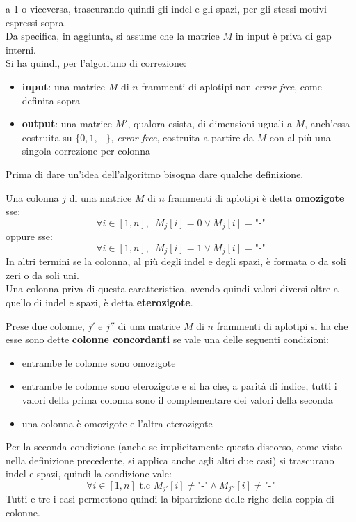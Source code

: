 \documentclass[a4paper,12pt, oneside]{book}
\begin{document}
a 1 o viceversa, trascurando quindi gli indel e gli spazi, per gli stessi motivi
espressi sopra.\\
Da specifica, in aggiunta, si assume che la matrice $M$ in input è priva di gap
interni.\\ 
Si ha quindi, per l'algoritmo di correzione:
\begin{itemize}
  \item \textbf{input}: una matrice $M$ di $n$ frammenti di aplotipi non
  \textit{error-free}, come definita sopra
  \item \textbf{output}: una matrice $M'$, qualora esista, di dimensioni uguali
  a $M$, anch'essa costruita su $\{0,1,-\}$, \textit{error-free}, costruita a
  partire da $M$ con al più una singola correzione per colonna
\end{itemize}
Prima di dare un'idea dell'algoritmo bisogna dare qualche definizione.
\begin{definizione}
  Una colonna $j$ di una matrice $M$ di $n$ frammenti di aplotipi è detta
  \textbf{omozigote} sse:
  \[\forall i\in[1,n],\,\,\, M_j[i]=0\lor M_j[i]=\mbox{"-"}\]
  oppure sse:
  \[\forall i\in[1,n],\,\,\, M_j[i]=1\lor M_j[i]=\mbox{"-"}\]
  In altri termini se la colonna, al più degli indel e degli spazi, è formata o
  da soli zeri o da soli uni.\\
  Una colonna priva di questa caratteristica, avendo quindi valori diversi oltre
  a quello di indel e spazi, è detta \textbf{eterozigote}.
\end{definizione}
\begin{definizione}
  Prese due colonne, $j'$ e $j''$ di una matrice $M$ di $n$ frammenti di
  aplotipi si ha che esse sono dette \textbf{colonne concordanti} se vale una
  delle seguenti condizioni:
  \begin{itemize}
    \item entrambe le colonne sono omozigote
    \item entrambe le colonne sono eterozigote e si ha che, a parità di indice,
    tutti i valori della prima colonna sono il complementare dei valori della
    seconda
    \item una colonna è omozigote e l'altra eterozigote
  \end{itemize}
  Per la seconda condizione (anche se implicitamente questo discorso, come visto
  nella definizione precedente, si applica anche agli altri due casi) si
  trascurano indel e spazi, quindi la condizione vale:
  \[\forall i\in[1,n] \mbox{ t.c } M_{j'}[i]\neq \mbox{"-"}\land M_{j''}[i]\neq 
    \mbox{"-"}\]
  Tutti e tre i casi permettono quindi la bipartizione delle righe della coppia
  di colonne.
\end{definizione}
\end{document}
